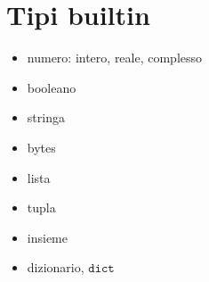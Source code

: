\documentclass[letterpaper,10pt,italian]{jupyterBook}
\begin{document}
\section{Tipi built\sphinxhyphen{}in}
\label{\detokenize{ch/programming/types:tipi-built-in}}\begin{itemize}
\item {} 
\sphinxAtStartPar
numero: intero, reale, complesso

\item {} 
\sphinxAtStartPar
booleano

\item {} 
\sphinxAtStartPar
stringa

\item {} 
\sphinxAtStartPar
bytes

\item {} 
\sphinxAtStartPar
lista

\item {} 
\sphinxAtStartPar
tupla

\item {} 
\sphinxAtStartPar
insieme

\item {} 
\sphinxAtStartPar
dizionario, \(\texttt{dict}\)

\end{itemize}
\end{document}
